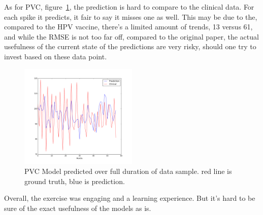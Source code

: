 \documentclass{sig-alternate}
\begin{document}
As for PVC, figure~\ref{fig:PVC_FULL}, the prediction is hard to compare to the clinical data. For each spike it predicts, it fair to say it misses one as well. This may be due to the, compared to the HPV vaccine, there's a limited amount of trends, 13 versus 61, and while the RMSE is not too far off, compared to the original paper, the actual usefulness of the current state of the predictions are very risky, should one try to invest based on these data point.
\begin{figure}[h!]
\centering
\includegraphics[width=0.5\textwidth]{pvc_full_prediction}
\caption{PVC Model predicted over full duration of data sample. red line is ground truth, blue is prediction.}
\label{fig:PVC_FULL}
\end{figure}

Overall, the exercise was engaging and a learning experience. But it's hard to be sure of the exact usefulness of the models as is.


%
%
\end{document}
